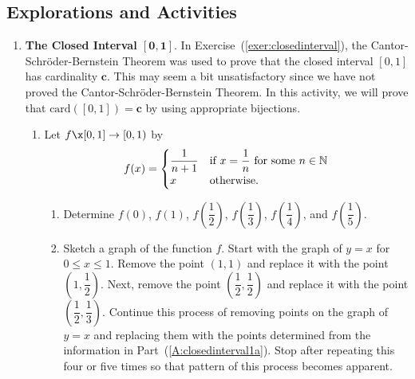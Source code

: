 \subsection*{Explorations and Activities}
\setcounter{oldenumi}{\theenumi}
\begin{enumerate} \setcounter{enumi}{\theoldenumi}
\item \textbf{The Closed Interval $\boldsymbol{ [ 0, 1 ]}$}.  \label{A:closedinterval}  In Exercise~(\ref{exer:closedinterval}), the Cantor-Schr\"{o}der-Bernstein Theorem was used to prove that the closed interval $[0, 1]$ has cardinality $\boldsymbol{c}$.  
This may seem a bit unsatisfactory since we have not proved the 
Cantor-Schr\"{o}der-Bernstein Theorem.  In this activity, we will prove that 
$\text{card} \!\left( [ 0, 1 ] \right) = \boldsymbol{c}$ by using appropriate bijections.

\begin{enumerate}
\item Let $f\x  [ 0, 1 ] \to [ 0, 1 )$ by
\begin{equation} \notag
f ( x ) = 
\begin{cases}
\dfrac{1}{n+1}         &\text{if $x=\dfrac{1}{n}$ for some $n \in \mathbb{N}$} \\
x        &\text{otherwise}.
\end{cases}
\end{equation}
\label{A:closedinterval1}%
%
\begin{enumerate}
\item Determine $f ( 0 )$, $f ( 1 )$, $f \!\left( \dfrac{1}{2} \right)$, 
$f \!\left( \dfrac{1}{3} \right)$, $f \!\left( \dfrac{1}{4} \right)$, and 
$f \!\left( \dfrac{1}{5} \right)$. 
\label{A:closedinterval1a}%
\item Sketch a graph of the function $f$.  \hint  Start with the graph of $y = x$ for 
$0 \leq x \leq 1$.  Remove the point $( 1, 1 )$ and replace it with the point 
$\!\left( 1, \dfrac{1}{2} \right)$.  Next, remove the point 
$\!\left( \dfrac{1}{2}, \dfrac{1}{2} \right)$ and replace it with the point 
$\!\left( \dfrac{1}{2}, \dfrac{1}{3} \right)$.  Continue this process of removing points on the graph of $y = x$ and replacing them with the points determined from the information in 
Part~(\ref{A:closedinterval1a}).  Stop after repeating this four or five times so that pattern of this process becomes apparent.


\end{enumerate}
\end{enumerate}
\end{enumerate}
